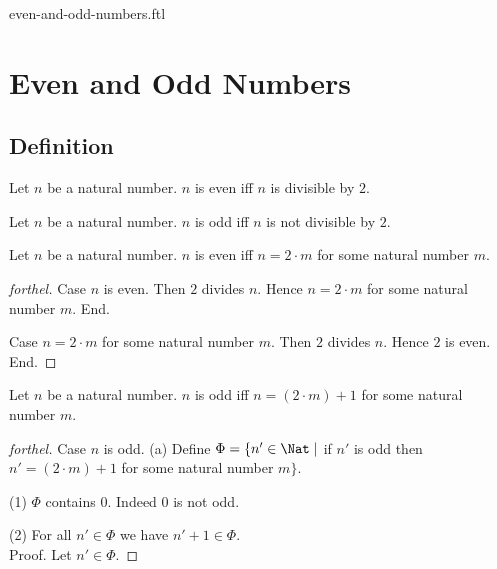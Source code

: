 \documentclass{naproche-library}
\begin{document}
\begin{smodule}{even-and-odd-numbers.ftl}

  \section*{Even and Odd Numbers}

  \subsection*{Definition}

  \begin{definition}[forthel,id=ARITHMETIC_15_4521358965847512]
    Let $n$ be a natural number.
    $n$ is even iff $n$ is divisible by $2$.
  \end{definition}

  \begin{definition}[forthel,id=ARITHMETIC_15_1023652125874596]
    Let $n$ be a natural number.
    $n$ is odd iff $n$ is not divisible by $2$.
  \end{definition}

  \begin{proposition}[forthel,id=ARITHMETIC_15_0236985458752156]
    Let $n$ be a natural number.
    $n$ is even iff $n = 2 \cdot m$ for some natural number $m$.
  \end{proposition}
  \begin{proof}[forthel]
    Case $n$ is even.
      Then $2$ divides $n$.
      Hence $n = 2 \cdot m$ for some natural number $m$.
    End.

    Case $n = 2 \cdot m$ for some natural number $m$.
      Then $2$ divides $n$.
      Hence $2$ is even.
    End.
  \end{proof}

  \begin{proposition}[forthel,id=ARITHMETIC_15_1023512547854265]
    Let $n$ be a natural number.
    $n$ is odd iff $n = (2 \cdot m) + 1$ for some natural number $m$.
  \end{proposition}
  \begin{proof}[forthel]
    Case $n$ is odd.
      (a) Define $\Phi = \{ n' \in \Nat \mid$ if $n'$ is odd then $n' = (2 \cdot m) + 1$ for some natural number $m \}$.

      (1) $\Phi$ contains $0$.
      Indeed $0$ is not odd.

      (2) For all $n' \in \Phi$ we have $n' + 1 \in \Phi$. \\
      Proof.
        Let $n' \in \Phi$.


\end{proof}
\end{smodule}
\end{document}
